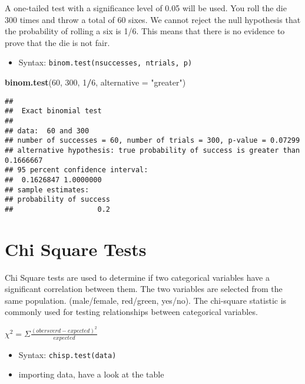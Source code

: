 \documentclass[
]{article}
\newenvironment{Shaded}{\begin{snugshade}}{\end{snugshade}}
\newcommand{\DataTypeTok}[1]{\textcolor[rgb]{0.13,0.29,0.53}{#1}}
\newcommand{\DecValTok}[1]{\textcolor[rgb]{0.00,0.00,0.81}{#1}}
\newcommand{\KeywordTok}[1]{\textcolor[rgb]{0.13,0.29,0.53}{\textbf{#1}}}
\newcommand{\NormalTok}[1]{#1}
\newcommand{\OperatorTok}[1]{\textcolor[rgb]{0.81,0.36,0.00}{\textbf{#1}}}
\newcommand{\StringTok}[1]{\textcolor[rgb]{0.31,0.60,0.02}{#1}}
\providecommand{\tightlist}{%
  \setlength{\itemsep}{0pt}\setlength{\parskip}{0pt}}
\begin{document}
A one-tailed test with a significance level of 0.05 will be used. You
roll the die 300 times and throw a total of 60 sixes. We cannot reject
the null hypothesis that the probability of rolling a six is 1/6. This
means that there is no evidence to prove that the die is not fair.

\begin{itemize}
\tightlist
\item
  Syntax: \texttt{binom.test(nsuccesses,\ ntrials,\ p)}
\end{itemize}

\begin{Shaded}
\begin{Highlighting}[]
\KeywordTok{binom.test}\NormalTok{(}\DecValTok{60}\NormalTok{, }\DecValTok{300}\NormalTok{, }\DecValTok{1}\OperatorTok{/}\DecValTok{6}\NormalTok{, }\DataTypeTok{alternative =} \StringTok{"greater"}\NormalTok{)}
\end{Highlighting}
\end{Shaded}

\begin{verbatim}
## 
##  Exact binomial test
## 
## data:  60 and 300
## number of successes = 60, number of trials = 300, p-value = 0.07299
## alternative hypothesis: true probability of success is greater than 0.1666667
## 95 percent confidence interval:
##  0.1626847 1.0000000
## sample estimates:
## probability of success 
##                    0.2
\end{verbatim}

\hypertarget{chi-square-tests}{%
\section{Chi Square Tests}\label{chi-square-tests}}

Chi Square tests are used to determine if two categorical variables have
a significant correlation between them. The two variables are selected
from the same population. (male/female, red/green, yes/no). The
chi-square statistic is commonly used for testing relationships between
categorical variables.

\(\chi^2=\Sigma \frac {(obersverd - expected)^2}{expected}\)

\begin{itemize}
\item
  Syntax: \texttt{chisp.test(data)}
\item
  importing data, have a look at the table
\end{itemize}
\end{document}
